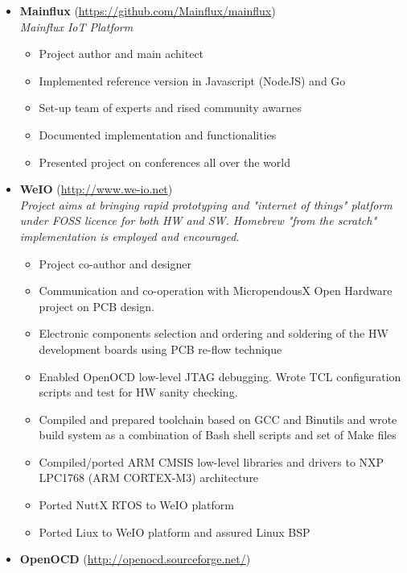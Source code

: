 \documentclass[a4paper, oneside, final]{scrartcl}
\begin{document}
\begin{itemize}
   \item \textbf{Mainflux} (\url{https://github.com/Mainflux/mainflux}) \\
      \textit{Mainflux IoT Platform}
      \begin{itemize}
         \item Project author and main achitect
		 \item Implemented reference version in Javascript (NodeJS) and Go
         \item Set-up team of experts and rised community awarnes
         \item Documented implementation and functionalities
         \item Presented project on conferences all over the world
      \end{itemize}
   \item \textbf{WeIO} (\url{http://www.we-io.net}) \\
      \textit{Project aims at bringing rapid prototyping and "internet of things"
         platform under FOSS licence for both HW and SW. Homebrew "from the scratch"
         implementation is employed and encouraged.}
      \begin{itemize}
         \item Project co-author and designer
         \item Communication and co-operation with MicropendousX Open Hardware
               project on PCB design.
         \item Electronic components selection and ordering and soldering of
               the HW development boards using PCB re-flow technique
         \item Enabled OpenOCD low-level JTAG debugging. Wrote TCL
               configuration scripts and test for HW sanity checking.
         \item Compiled and prepared toolchain based on GCC and Binutils and
               wrote build system as a combination of Bash shell scripts and set of Make files
         \item Compiled/ported ARM CMSIS low-level libraries and drivers to NXP
                  LPC1768 (ARM CORTEX-M3) architecture
         \item Ported NuttX RTOS to WeIO platform
         \item Ported Liux to WeIO platform and assured Linux BSP
      \end{itemize}
   \item \textbf{OpenOCD} (\url{http://openocd.sourceforge.net/}) \\

\end{itemize}
\end{document}
